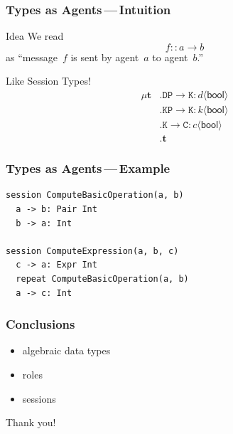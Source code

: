 \documentclass{beamer}
\begin{document}

\begin{frame}[fragile]
\frametitle{Types as Agents\,---\,Intuition}
\begin{block}{Idea}
We read \[f :: a \to b\] as
``message~$f$ is sent by agent~$a$ to agent~$b$.''
\end{block}
\begin{block}{Like Session Types!}
\begin{align*}
\mu\mathbf{t}&.\mathtt{DP}\to\mathtt{K}:d\langle\mathsf{bool}\rangle \\
  &.\mathtt{KP}\to\mathtt{K}:k\langle\mathsf{bool}\rangle\\
  &.\mathtt{K}\to\mathtt{C}:c\langle\mathsf{bool}\rangle\\
  &.\mathbf{t}
\end{align*}
\end{block}
\note[item]{}
\end{frame}

\begin{frame}[fragile]
\frametitle{Types as Agents\,---\,Example}
\begin{lstlisting}
session ComputeBasicOperation(a, b)
  a -> b: Pair Int
  b -> a: Int

session ComputeExpression(a, b, c)
  c -> a: Expr Int
  repeat ComputeBasicOperation(a, b)
  a -> c: Int
\end{lstlisting}
\note[item]{}
\end{frame}

\begin{frame}
\frametitle{Conclusions}
\begin{itemize}
\item \alert{algebraic data types}
\item roles
\item sessions
\end{itemize}
\end{frame}

\begin{frame}
\centerline{Thank you!}
\note[item]{}
\end{frame}
\end{document}
